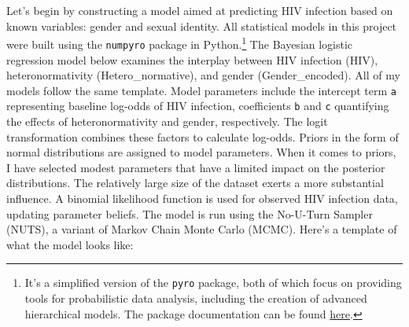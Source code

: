 \documentclass[
  12pt,
  letterpaper,
  DIV=11,
  numbers=noendperiod]{scrartcl}
\begin{document}
Let's begin by constructing a model aimed at predicting HIV infection
based on known variables: gender and sexual identity. All statistical
models in this project were built using the \texttt{numpyro} package in
Python.\footnote{It's a simplified version of the \texttt{pyro} package,
  both of which focus on providing tools for probabilistic data
  analysis, including the creation of advanced hierarchical models. The
  package documentation can be found
  \href{https://num.pyro.ai/en/latest/index.html\#introductory-tutorials}{here}.}
The Bayesian logistic regression model below examines the interplay
between HIV infection (HIV), heteronormativity (Hetero\_normative), and
gender (Gender\_encoded). All of my models follow the same template.
Model parameters include the intercept term \texttt{a} representing
baseline log-odds of HIV infection, coefficients \texttt{b} and
\texttt{c} quantifying the effects of heteronormativity and gender,
respectively. The logit transformation combines these factors to
calculate log-odds. Priors in the form of normal distributions are
assigned to model parameters. When it comes to priors, I have selected
modest parameters that have a limited impact on the posterior
distributions. The relatively large size of the dataset exerts a more
substantial influence. A binomial likelihood function is used for
observed HIV infection data, updating parameter beliefs. The model is
run using the No-U-Turn Sampler (NUTS), a variant of Markov Chain Monte
Carlo (MCMC). Here's a template of what the model looks like:

\footnotesize
\end{document}
